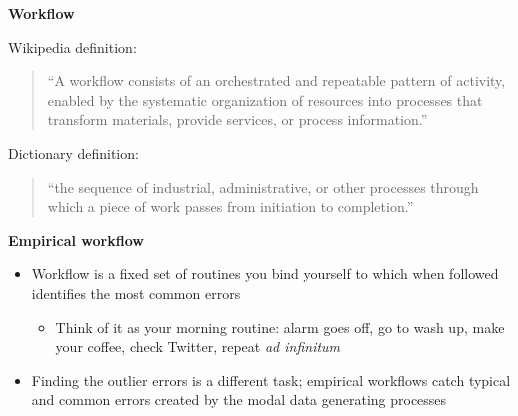 \documentclass[notes=show]{beamer}
\begin{document}
\begin{frame}[plain]
\begin{center}
\textbf{Workflow}
\end{center}

Wikipedia definition: 

\begin{quote}
``A workflow consists of an orchestrated and repeatable pattern of activity, enabled by the systematic organization of resources into processes that transform materials, provide services, or process information.''
\end{quote}

Dictionary definition:
\begin{quote}
``the sequence of industrial, administrative, or other processes through which a piece of work passes from initiation to completion.''
\end{quote}

\end{frame}



\begin{frame}[plain]
\begin{center}
\textbf{Empirical workflow}
\end{center}

\begin{itemize}
\item Workflow is a fixed set of routines you bind yourself to which when followed identifies the most common errors
	\begin{itemize}
	\item Think of it as your morning routine: alarm goes off, go to wash up, make your coffee, check Twitter, repeat \emph{ad infinitum}
	\end{itemize}
\item Finding the outlier errors is a different task;  empirical workflows catch typical and common errors created by the modal data generating processes
\end{itemize}

\end{frame}
\end{document}
